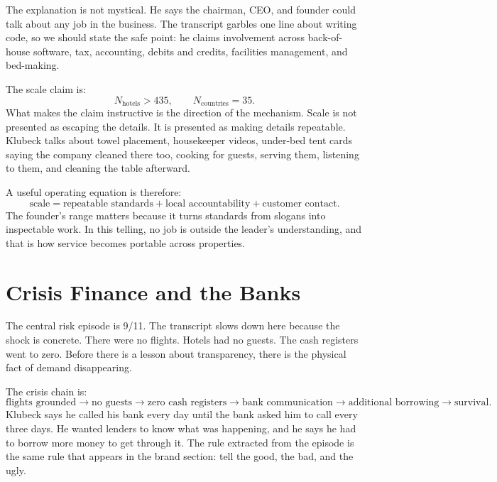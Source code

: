 The explanation is not mystical. He says the chairman, CEO, and founder could talk about any job in the business. The transcript garbles one line about writing code, so we should state the safe point: he claims involvement across back-of-house software, tax, accounting, debits and credits, facilities management, and bed-making.

The scale claim is:
\begin{equation}
N_{\text{hotels}}>435,
\qquad
N_{\text{countries}}=35.
\end{equation}
What makes the claim instructive is the direction of the mechanism. Scale is not presented as escaping the details. It is presented as making details repeatable. Klubeck talks about towel placement, housekeeper videos, under-bed tent cards saying the company cleaned there too, cooking for guests, serving them, listening to them, and cleaning the table afterward.

A useful operating equation is therefore:
\begin{equation}
\text{scale}
=
\text{repeatable standards}
+
\text{local accountability}
+
\text{customer contact}.
\end{equation}
The founder's range matters because it turns standards from slogans into inspectable work. In this telling, no job is outside the leader's understanding, and that is how service becomes portable across properties.

\section{Crisis Finance and the Banks}

The central risk episode is 9/11. The transcript slows down here because the shock is concrete. There were no flights. Hotels had no guests. The cash registers went to zero. Before there is a lesson about transparency, there is the physical fact of demand disappearing.

The crisis chain is:
\begin{equation}
\text{flights grounded}
\rightarrow
\text{no guests}
\rightarrow
\text{zero cash registers}
\rightarrow
\text{bank communication}
\rightarrow
\text{additional borrowing}
\rightarrow
\text{survival}.
\end{equation}
Klubeck says he called his bank every day until the bank asked him to call every three days. He wanted lenders to know what was happening, and he says he had to borrow more money to get through it. The rule extracted from the episode is the same rule that appears in the brand section: tell the good, the bad, and the ugly.

